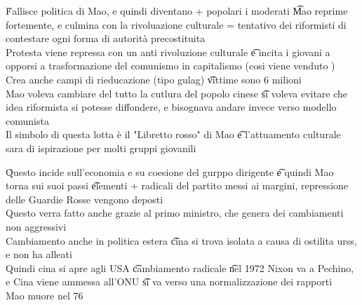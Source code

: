 \documentclass[12pt]{article}
\begin{document}
\v

Fallisce politica di Mao, e quindi diventano + popolari i moderati \t Mao reprime fortemente, e culmina con la rivoluazione culturale = tentativo dei riformisti di contestare ogni forma di autorità precostituita \\
Protesta viene repressa con un anti rivoluzione culturale \t e incita i giovani a opporsi a trasformazione del comunismo in capitalismo (cosi viene venduto ) \\
Crea anche campi di rieducazione (tipo gulag) \t vittime sono 6 milioni \\
Mao voleva cambiare del tutto la cutlura del popolo cinese \t si voleva evitare che idea riformista si potesse diffondere, e bisognava andare invece verso modello comunista \\
Il simbolo di questa lotta è il "Libretto rosso" di Mao \t e l'attuamento culturale sara di ispirazione per molti gruppi giovanili

\v

Questo incide sull'economia e su coesione del gurppo dirigente \t e quindi Mao torna sui suoi passi \t elementi + radicali del partito messi ai margini, repressione delle Guardie Rosse vengono deposti \\
Questo verra fatto anche grazie al primo ministro, che genera dei cambiamenti non aggressivi \\
Cambiamento anche in politica estera \t cina si trova isolata a causa di ostilita urss, e non ha alleati \\
Quindi cina si apre agli USA \t cambiamento radicale \t nel 1972 Nixon va a Pechino, e Cina viene ammessa all'ONU \t si va verso una normalizzazione dei rapporti \\
Mao muore nel 76
\end{document}
